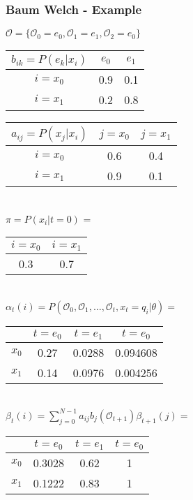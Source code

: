 \begin{frame}
	\frametitle{Baum Welch - Example}
  \begin{table}
  \centering
  $\mathcal{O} = \{\mathcal{O}_0 = e_0, \mathcal{O}_1 = e_1, \mathcal{O}_2 = e_0\}$\\
  \begin{tabular}{| c | c | c |}
  	\hline
    $b_{ik} = P(e_k|x_i)$ & $e_0$ & $e_1$ \\ \hline
    $i = x_0$                 & 0.9   & 0.1   \\ \hline
    $i = x_1$                 & 0.2   & 0.8   \\ \hline
  \end{tabular}
  \begin{tabular}{| c | c | c |}
  	\hline
    $a_{ij} = P(x_j|x_i)$ & $j = x_0$ & $j = x_1$ \\ \hline
    $i = x_0$                 & 0.6   & 0.4   \\ \hline
    $i = x_1$                 & 0.9   & 0.1   \\ \hline
  \end{tabular}
  \\$\pi = P(x_i|t=0)$ =
  \begin{tabular}{| c | c |}
  	\hline
    $i = x_0$ & $i = x_1$ \\ \hline
    0.3   & 0.7   \\ \hline
  \end{tabular}\\  
  $\alpha_t(i) = P(\mathcal{O}_0, \mathcal{O}_1, \dots ,\mathcal{O}_t , x_t = q_i | \theta) =$
  \begin{tabular}{| c | c | c | c |}
  	\hline
          & $t=e_0$ & $t=e_1$ & $t=e_0$ \\ \hline
    $x_0$ & 0.27    & 0.0288  & 0.094608 \\ \hline
    $x_1$ & 0.14    & 0.0976  & 0.004256 \\ \hline
  \end{tabular}\\
  $\beta_t(i) = \sum\limits_{j=0}^{N-1} a_{ij} b_j(\mathcal{O}_{t+1})\beta_{t+1}(j) =$
  \begin{tabular}{| c | c | c | c |}
  	\hline
          & $t=e_0$ & $t=e_1$ & $t=e_0$ \\ \hline
    $x_0$ & 0.3028  & 0.62    & 1       \\ \hline
    $x_1$ & 0.1222  & 0.83    & 1       \\ \hline
  \end{tabular}\\
\end{table}
\end{frame}

